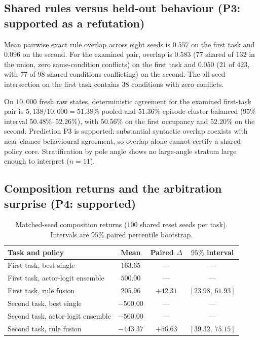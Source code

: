 \documentclass[11pt,a4paper]{article}
\theoremstyle{definition}
\begin{document}
\subsection{Shared rules versus held-out behaviour (P3: supported as a refutation)}

Mean pairwise exact rule overlap across eight seeds is $0.557$ on the first
task and $0.096$ on the second. For the examined pair, overlap is $0.583$
($77$ shared of $132$ in the union, zero same-condition conflicts) on the
first task and $0.050$ ($21$ of $423$, with $77$ of $98$ shared conditions
conflicting) on the second. The all-seed intersection on the first task
contains $38$ conditions with zero conflicts.

On $10{,}000$ fresh raw states, deterministic agreement for the examined
first-task pair is $5{,}138/10{,}000 = 51.38\%$ pooled and $51.36\%$
episode-cluster balanced ($95\%$ interval $50.48\%$--$52.26\%$), with
$50.56\%$ on the first occupancy and $52.20\%$ on the second. Prediction P3
is supported: substantial syntactic overlap coexists with near-chance
behavioural agreement, so overlap alone cannot certify a shared policy core.
Stratification by pole angle shows no large-angle stratum large enough to
interpret ($n=11$).

\subsection{Composition returns and the arbitration surprise (P4: supported)}

\begin{table}[t]
\centering
\caption{Matched-seed composition returns ($100$ shared reset seeds per
task). Intervals are $95\%$ paired percentile bootstrap.}
\label{tab:returns}
{\small
\begin{tabular}{lccc}
\toprule
Task and policy & Mean & Paired $\Delta$ & $95\%$ interval \\
\midrule
First task, best single & $163.65$ & --- & --- \\
First task, actor-logit ensemble & $500.00$ & --- & --- \\
First task, rule fusion & $205.96$ & $+42.31$ & $[23.98,\,61.93]$ \\
Second task, best single & $-500.00$ & --- & --- \\
Second task, actor-logit ensemble & $-500.00$ & --- & --- \\
Second task, rule fusion & $-443.37$ & $+56.63$ & $[39.32,\,75.15]$ \\
\bottomrule
\end{tabular}
}
\end{table}
\end{document}
